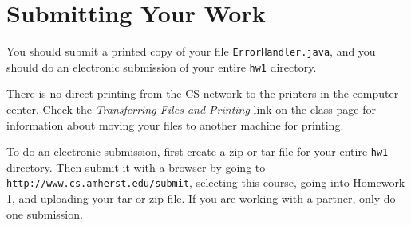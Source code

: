 \documentclass[11pt]{article}
\begin{document}
\section{Submitting Your Work}
You should submit a printed copy of your file {\tt ErrorHandler.java}, and you should do an electronic submission of your entire {\tt hw1} directory.  

There is no direct printing from the CS network to the printers in the computer center.  Check the {\em Transferring Files and Printing} link on the class page for information about moving your files to another machine for printing.

To do an electronic submission, first create a zip or tar file for your entire {\tt hw1} directory.  Then submit it with a browser by going to \verb'http://www.cs.amherst.edu/submit', selecting this course, going into Homework 1, and uploading your tar or zip file.  If you are working with a partner, only do one submission.
\end{document}
